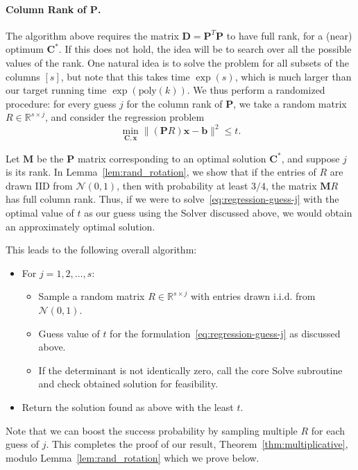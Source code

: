 \documentclass[11pt]{article}
\theoremstyle{plain}
\theoremstyle{plain}
\theoremstyle{definition}
\theoremstyle{plain}
\theoremstyle{remark}
\newcommand{\RR}{\mathbb{R}}
\newcommand{\cN}{\mathcal{N}}
\begin{document}
\paragraph{Column Rank of $\bm{P}$.}  The algorithm above requires the matrix $\bm{D} = \bm{P}^T \bm{P}$ to have full rank, for a (near) optimum $\bm{C}^*$. If this does not hold, the idea will be to search over all the possible values of the rank. One natural idea is to solve the problem for all subsets of the columns $[s]$, but note that this takes time $\exp(s)$, which is much larger than our target running time $\exp(\text{poly}(k))$.  We thus perform a randomized procedure: for every guess $j$ for the column rank of $\bm{P}$, we take a random matrix $R \in \RR^{s \times j}$, and consider the regression problem
\begin{equation}\label{eq:regression-guess-j} \min_{\bm{C}, \bm{x}} \| (\bm{P} R) \bm{x} - \bm{b} \|^2 \le t. 
\end{equation}

Let $\bm{M}$ be the $\bm{P}$ matrix corresponding to an optimal solution $\bm{C}^*$, and suppose $j$ is its rank. In Lemma~\ref{lem:rand_rotation}, we show that if the entries of $R$ are drawn IID from $\cN(0,1)$, then with probability at least $3/4$, the matrix $\bm{M} R$ has full column rank. Thus, if we were to solve~\eqref{eq:regression-guess-j} with the optimal value of $t$ as our guess using the Solver discussed above, we would obtain an approximately optimal solution.

This leads to the following overall algorithm: 
\begin{itemize}
\item  For $j = 1, 2, \dots, s$:
\begin{itemize}
\item Sample a random matrix $R \in \RR^{s \times j}$ with entries drawn i.i.d. from $\cN(0,1)$.
\item Guess value of $t$ for the formulation~\eqref{eq:regression-guess-j} as discussed above.
\item If the determinant is not identically zero, call the core Solve subroutine and check obtained solution for feasibility.
\end{itemize}
\item Return the solution found as above with the least $t$.
\end{itemize}

Note that we can boost the success probability by sampling multiple $R$ for each guess of $j$.  
This completes the proof of our result, Theorem~\ref{thm:multiplicative}, modulo Lemma~\ref{lem:rand_rotation} which we prove below.
\end{document}
